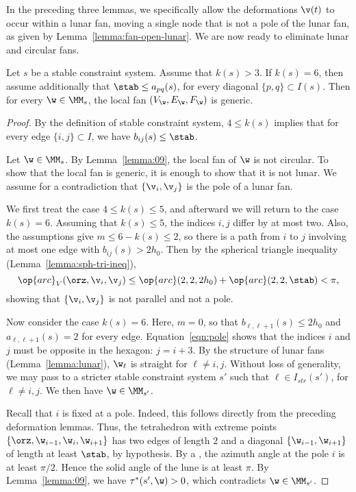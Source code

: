 In the preceding three lemmas, we specifically allow the deformations
$\v(t)$ to occur within a lunar fan, moving a single node that is not a pole
of the lunar fan, as given by Lemma~\ref{lemma:fan-open-lunar}.
We are now ready to eliminate  lunar and circular
fans.

\begin{lemma}\label{lemma:bjo} 
Let $s$ be a stable constraint system.
Assume that $k(s)>3$.
If $k(s)=6$, then assume additionally that
$\stab\le a_{pq}(s)$, for every diagonal $\{p,q\}\subset I(s)$.
Then for every  $\w\in\MM_s$,  the local fan $(V_\w,E_\w,F_\w)$ is generic.
\end{lemma}

\begin{proof}
By the definition of stable constraint system, $4\le k(s)$ implies
that  for every edge $\{i,j\}\subset I$, we have
$b_{i j}(s) \le\stab$.

Let $\w\in \MM_s$.  By Lemma~\ref{lemma:09}, the local fan of $\w$  is not circular.
To show that the local fan is generic, it is enough to show that it is not lunar.
We assume for a contradiction that $\{\v_i,\v_j\}$ is the pole of a lunar fan.

We first treat the case  $4\le k(s)\le 5$,
and afterward we will return to the case $k(s)=6$. 
Assuming that  $k(s)\le 5$, the indices $i,j$ differ by at most two.
Also, the assumptions give $m\le 6-k(s)\le 2$, so there is a path from
$i$ to $j$ involving at most one edge with $b_{i j}(s)>2h_0$.
Then by the spherical triangle inequality (Lemma~\ref{lemma:sph-tri-ineq}),
\begin{equation}\label{eqn:pole}
\op{arc}_V(\orz,\v_i,\v_j) \le \op{arc}(2,2,2h_0) + \op{arc}(2,2,\stab) < \pi,
\end{equation}
showing that $\{\v_i,\v_j\}$ is not parallel and not a pole.

Now consider the case $k(s)=6$.  Here, $m=0$, so that $b_{\ell,\ell+1}(s)\le 2h_0$
and $a_{\ell,\ell+1}(s)=2$
for every edge. Equation~\ref{eqn:pole} shows that the indices $i$ and $j$
must be opposite in the hexagon: $j = i+3$.  By the structure of lunar fans
(Lemma~\ref{lemma:lunar}), $\w_\ell$ is straight for $\ell\ne i,j$.  Without
loss of generality, we may
pass to a stricter stable constraint system $s'$ such that
$\ell\in I_{str}(s')$, for $\ell\ne i,j$.  We then have $\w\in \MM_{s'}$.

Recall that $i$ is fixed at a pole. 
  Indeed, this follows directly from the preceding deformation
lemmas.  Thus, the tetrahedron with extreme points
$\{\orz,\w_{i-1},\w_i,\w_{i+1}\}$ has two edges
of length $2$ and a diagonal $\{\w_{i-1},\w_{i+1}\}$ of length at least
$\stab$, by hypothesis.  By a , 
the azimuth angle at the pole $i$ is at least $\pi/2$.
Hence the solid angle of the lune is at least $\pi$.  By Lemma~\ref{lemma:09},
we have $\tau^*(s',\w)>0$, which contradicts $\w\in \MM_{s'}$.
\end{proof}


